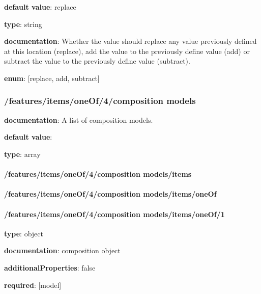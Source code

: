 \begin{itemized}
\item {\bf default value}: replace
\item {\bf type}: string
\item {\bf documentation}: Whether the value should replace any value previously defined at this location (replace), add the value to the previously define value (add) or subtract the value to the previously define value (subtract).
\item {\bf enum}: [replace, add, subtract]\end{itemized}\subsubsection{/features/items/oneOf/4/composition models} \begin{itemized}
\item {\bf documentation}: A list of composition models.
\item {\bf default value}: 
\item {\bf type}: array
\paragraph{/features/items/oneOf/4/composition models/items} \begin{itemized}
\end{itemized}\end{itemized}\paragraph{/features/items/oneOf/4/composition models/items/oneOf} \begin{itemized}
\end{itemized}\paragraph{/features/items/oneOf/4/composition models/items/oneOf/1} \begin{itemized}
\item {\bf type}: object
\item {\bf documentation}: composition object
\item {\bf additionalProperties}: false
\item {\bf required}: [model]\end{itemized}
